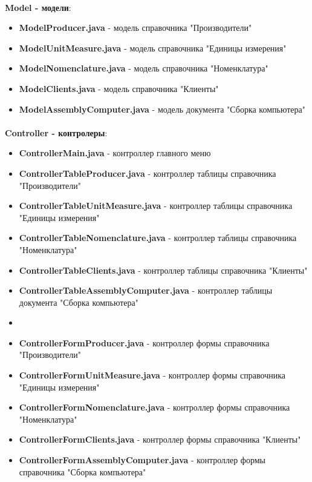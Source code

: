 \documentclass[12pt, a4paper, simple]{eskdtext}
\begin{document}
    \paragraph{} \textbf{Model - модели}:

    \begin{itemize}
        \item \textbf{ModelProducer.java} - модель справочника "Производители"
        \item \textbf{ModelUnitMeasure.java} - модель справочника "Единицы измерения"
        \item \textbf{ModelNomenclature.java} - модель справочника "Номенклатура"
        \item \textbf{ModelClients.java} - модель справочника "Клиенты"
        \item \textbf{ModelAssemblyComputer.java} - модель документа "Сборка компьютера"
    \end{itemize}

    \paragraph{} \textbf{Controller - контролеры}:

    \begin{itemize}
        \item \textbf{ControllerMain.java} - контроллер главного меню
        \item \textbf{ControllerTableProducer.java} - контроллер таблицы справочника "Производители"
        \item \textbf{ControllerTableUnitMeasure.java} - контроллер таблицы справочника "Единицы измерения"
        \item \textbf{ControllerTableNomenclature.java} - контроллер таблицы справочника "Номенклатура"
        \item \textbf{ControllerTableClients.java} - контроллер таблицы справочника "Клиенты"
        \item \textbf{ControllerTableAssemblyComputer.java} - контроллер таблицы документа "Сборка компьютера"
        \item[] \hspace{0pt}
        \item \textbf{ControllerFormProducer.java} - контроллер формы справочника "Производители"
        \item \textbf{ControllerFormUnitMeasure.java} - контроллер формы справочника "Единицы измерения"
        \item \textbf{ControllerFormNomenclature.java} - контроллер формы справочника "Номенклатура"
        \item \textbf{ControllerFormClients.java} - контроллер формы справочника "Клиенты"
        \item \textbf{ControllerFormAssemblyComputer.java} - контроллер формы справочника "Сборка компьютера"
    \end{itemize}
\end{document}
